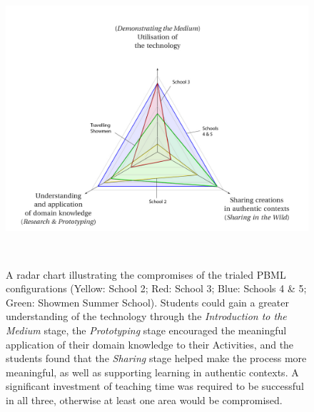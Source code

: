 \begin{figure}
\centering
  \includegraphics[width=1\columnwidth]{images/chapter08/radarChart.jpg}

  \caption[A radar chart illustrating the compromises of the different PBML configurations.]{A radar chart illustrating the compromises of the trialed PBML configurations (Yellow: School 2; Red: School 3; Blue: Schools 4 \& 5; Green: Showmen Summer School). Students could gain a greater understanding of the technology through the \textit{Introduction to the Medium} stage, the \textit{Prototyping} stage encouraged the meaningful application of their domain knowledge to their Activities, and the students found that the \textit{Sharing} stage helped make the process more meaningful, as well as supporting learning in authentic contexts. A significant investment of teaching time was required to be successful in all three, otherwise at least one area would be compromised. }~\label{fig:PBMLradar}
\end{figure}

